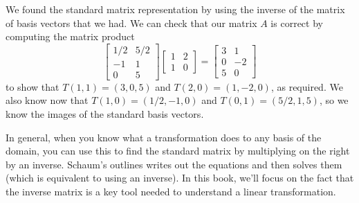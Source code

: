 \begin{example}
We found the standard matrix representation by using the inverse of the matrix of basis vectors that we had. We can check that our matrix $A$ is correct by computing the matrix product 
$$\begin{bmatrix}1/2&5/2\\-1&1\\0&5\end{bmatrix}
\begin{bmatrix}1&2\\1&0\end{bmatrix} 
= \begin{bmatrix}3&1\\0&-2\\5&0\end{bmatrix}$$ to show that $T(1,1)=(3,0,5)$ and $T(2,0)=(1,-2,0)$, as required.  We also know now that $T(1,0) = (1/2,-1,0)$ and $T(0,1)=(5/2,1,5)$, so we know the images of the standard basis vectors. 
\end{example}
 
In general, when you know what a transformation does to any basis of the domain, you can use this to find the standard matrix by multiplying on the right by an inverse.  
Schaum's outlines writes out the equations and then solves them (which is equivalent to using an inverse). In this book, we'll focus on the fact that the inverse matrix is a key tool needed to understand a linear transformation.




